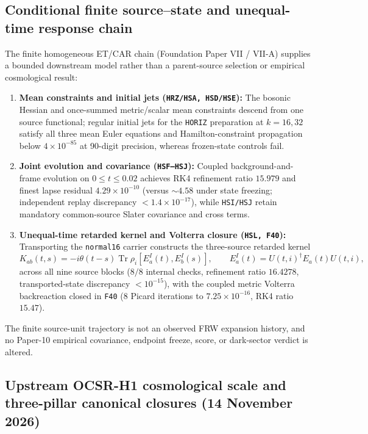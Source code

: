 \documentclass[11pt]{article}
\begin{document}
\subsection{Conditional finite source--state and unequal-time response chain}
\label{sec:etcar-chain-20261110}
The finite homogeneous ET/CAR chain (Foundation Paper VII / VII-A) supplies a
bounded downstream model rather than a parent-source selection or empirical
cosmological result:
\begin{enumerate}[leftmargin=*]
\item \textbf{Mean constraints and initial jets (\texttt{HRZ/HSA, HSD/HSE}):}
The bosonic Hessian and once-summed metric/scalar mean constraints descend from
one source functional; regular initial jets for the \texttt{HORIZ} preparation
at $k=16,32$ satisfy all three mean Euler equations and Hamilton-constraint
propagation below $4\times 10^{-85}$ at 90-digit precision, whereas frozen-state
controls fail.
\item \textbf{Joint evolution and covariance (\texttt{HSF--HSJ}):}
Coupled background-and-frame evolution on $0\leq t\leq 0.02$ achieves RK4
refinement ratio $15.979$ and finest lapse residual $4.29\times 10^{-10}$
(versus $\sim 4.58$ under state freezing; independent replay discrepancy
$<1.4\times 10^{-17}$), while \texttt{HSI/HSJ} retain mandatory common-source
Slater covariance and cross terms.
\item \textbf{Unequal-time retarded kernel and Volterra closure (\texttt{HSL, F40}):}
Transporting the \texttt{normal16} carrier constructs the three-source retarded
kernel
\[
K_{ab}(t,s)=-i\theta(t-s)\operatorname{Tr}\rho_i[E_a^I(t),E_b^I(s)],
\qquad E_a^I(t)=U(t,i)^\dagger E_a(t)U(t,i),
\]
across all nine source blocks ($8/8$ internal checks, refinement ratio
$16.4278$, transported-state discrepancy $<10^{-15}$), with the coupled metric
Volterra backreaction closed in \texttt{F40} ($8$ Picard iterations to
$7.25\times 10^{-16}$, RK4 ratio $15.47$).
\end{enumerate}
The finite source-unit trajectory is not an observed FRW expansion history, and
no Paper-10 empirical covariance, endpoint freeze, score, or dark-sector verdict
is altered.

\subsection{Upstream OCSR-H1 cosmological scale and three-pillar canonical closures (14 November 2026)}
\label{sec:upstream-ocsr-cosmology-20260929}
\end{document}
